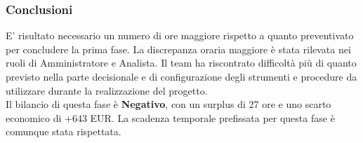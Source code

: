\subsubsection{Conclusioni}
E' risultato necessario un numero di ore maggiore rispetto a quanto preventivato per concludere la prima fase. La discrepanza oraria maggiore è stata rilevata nei ruoli di Amministratore e Analista. Il team ha riscontrato difficoltà più di quanto previsto nella parte decisionale e di configurazione degli strumenti e procedure da utilizzare durante la realizzazione del progetto.
\\Il bilancio di questa fase è \textbf{Negativo}, con un surplus di 27 ore e uno scarto economico di +643 EUR. La scadenza temporale prefissata per questa fase è comunque stata rispettata.